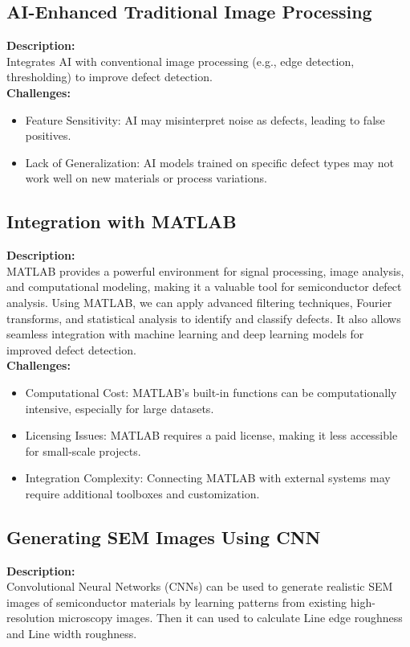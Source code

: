 \documentclass[12pt,oneside,letterpaper,english]{article}
\begin{document}
\subsection{AI-Enhanced Traditional Image Processing}
\textbf{Description:}\\
 Integrates AI with conventional image processing (e.g., edge detection, thresholding) to improve defect detection.\\

\textbf{Challenges:}
\begin{itemize}
	\item Feature Sensitivity: AI may misinterpret noise as defects, leading to false positives.
	\item Lack of Generalization: AI models trained on specific defect types may not work well on new materials or process variations.
	
\end{itemize}

\subsection{Integration with MATLAB}
\textbf{Description:}\\
MATLAB provides a powerful environment for signal processing, image analysis, and computational modeling, making it a valuable tool for semiconductor defect analysis. Using MATLAB, we can apply advanced filtering techniques, Fourier transforms, and statistical analysis to identify and classify defects. It also allows seamless integration with machine learning and deep learning models for improved defect detection.\\

\textbf{Challenges:}
\begin{itemize}
	\item Computational Cost: MATLAB's built-in functions can be computationally intensive, especially for large datasets.
	\item Licensing Issues: MATLAB requires a paid license, making it less accessible for small-scale projects.
	\item Integration Complexity: Connecting MATLAB with external systems may require additional toolboxes and customization.
	
\end{itemize}

\subsection{Generating SEM Images Using CNN}
\textbf{Description:}\\
Convolutional Neural Networks (CNNs) can be used to generate realistic SEM images of semiconductor materials by learning patterns from existing high-resolution microscopy images. Then it can used to calculate Line edge roughness and Line width roughness.\\
\end{document}
